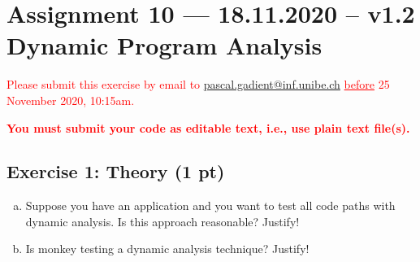 \documentclass [11pt, a4wide, twoside]{article}
\begin{document}
\section*{Assignment 10 --- 18.11.2020 -- v1.2\\Dynamic Program Analysis}

\textcolor{red}{Please submit this exercise by email to \href{mailto:pascal.gadient@inf.unibe.ch}{pascal.gadient@inf.unibe.ch} \underline{before} 25 November 2020, 10:15am.\begin{center}\textbf{You must submit your code as editable text, i.e., use plain text file(s).}\end{center}}

\subsection*{Exercise 1: Theory (1 pt)}
\begin{enumerate}[a)]
\item Suppose you have an application and you want to test all code paths with dynamic analysis. Is this approach reasonable? Justify!
\item Is monkey testing a dynamic analysis technique? Justify!
\end{enumerate}
\end{document}
